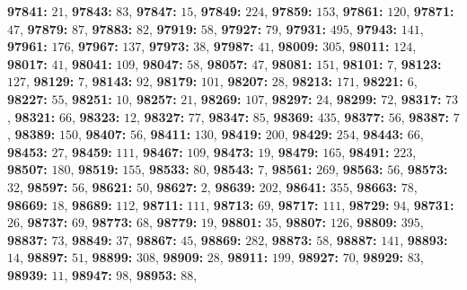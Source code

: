 \textsf{\bfseries 97841:} $21$, \textsf{\bfseries 97843:} $83$, \textsf{\bfseries 97847:} $15$, \textsf{\bfseries 97849:} $224$, \textsf{\bfseries 97859:} $153$, \textsf{\bfseries 97861:} $120$, \textsf{\bfseries 97871:} $47$, \textsf{\bfseries 97879:} $87$, \textsf{\bfseries 97883:} $82$, \textsf{\bfseries 97919:} $58$, \textsf{\bfseries 97927:} $79$, \textsf{\bfseries 97931:} $495$, \textsf{\bfseries 97943:} $141$, \textsf{\bfseries 97961:} $176$, \textsf{\bfseries 97967:} $137$, \textsf{\bfseries 97973:} $38$, \textsf{\bfseries 97987:} $41$, \textsf{\bfseries 98009:} $305$, \textsf{\bfseries 98011:} $124$, \textsf{\bfseries 98017:} $41$, \textsf{\bfseries 98041:} $109$, \textsf{\bfseries 98047:} $58$, \textsf{\bfseries 98057:} $47$, \textsf{\bfseries 98081:} $151$, \textsf{\bfseries 98101:} $7$, \textsf{\bfseries 98123:} $127$, \textsf{\bfseries 98129:} $7$, \textsf{\bfseries 98143:} $92$, \textsf{\bfseries 98179:} $101$, \textsf{\bfseries 98207:} $28$, \textsf{\bfseries 98213:} $171$, \textsf{\bfseries 98221:} $6$, \textsf{\bfseries 98227:} $55$, \textsf{\bfseries 98251:} $10$, \textsf{\bfseries 98257:} $21$, \textsf{\bfseries 98269:} $107$, \textsf{\bfseries 98297:} $24$, \textsf{\bfseries 98299:} $72$, \textsf{\bfseries 98317:} $73$, \textsf{\bfseries 98321:} $66$, \textsf{\bfseries 98323:} $12$, \textsf{\bfseries 98327:} $77$, \textsf{\bfseries 98347:} $85$, \textsf{\bfseries 98369:} $435$, \textsf{\bfseries 98377:} $56$, \textsf{\bfseries 98387:} $7$, \textsf{\bfseries 98389:} $150$, \textsf{\bfseries 98407:} $56$, \textsf{\bfseries 98411:} $130$, \textsf{\bfseries 98419:} $200$, \textsf{\bfseries 98429:} $254$, \textsf{\bfseries 98443:} $66$, \textsf{\bfseries 98453:} $27$, \textsf{\bfseries 98459:} $111$, \textsf{\bfseries 98467:} $109$, \textsf{\bfseries 98473:} $19$, \textsf{\bfseries 98479:} $165$, \textsf{\bfseries 98491:} $223$, \textsf{\bfseries 98507:} $180$, \textsf{\bfseries 98519:} $155$, \textsf{\bfseries 98533:} $80$, \textsf{\bfseries 98543:} $7$, \textsf{\bfseries 98561:} $269$, \textsf{\bfseries 98563:} $56$, \textsf{\bfseries 98573:} $32$, \textsf{\bfseries 98597:} $56$, \textsf{\bfseries 98621:} $50$, \textsf{\bfseries 98627:} $2$, \textsf{\bfseries 98639:} $202$, \textsf{\bfseries 98641:} $355$, \textsf{\bfseries 98663:} $78$, \textsf{\bfseries 98669:} $18$, \textsf{\bfseries 98689:} $112$, \textsf{\bfseries 98711:} $111$, \textsf{\bfseries 98713:} $69$, \textsf{\bfseries 98717:} $111$, \textsf{\bfseries 98729:} $94$, \textsf{\bfseries 98731:} $26$, \textsf{\bfseries 98737:} $69$, \textsf{\bfseries 98773:} $68$, \textsf{\bfseries 98779:} $19$, \textsf{\bfseries 98801:} $35$, \textsf{\bfseries 98807:} $126$, \textsf{\bfseries 98809:} $395$, \textsf{\bfseries 98837:} $73$, \textsf{\bfseries 98849:} $37$, \textsf{\bfseries 98867:} $45$, \textsf{\bfseries 98869:} $282$, \textsf{\bfseries 98873:} $58$, \textsf{\bfseries 98887:} $141$, \textsf{\bfseries 98893:} $14$, \textsf{\bfseries 98897:} $51$, \textsf{\bfseries 98899:} $308$, \textsf{\bfseries 98909:} $28$, \textsf{\bfseries 98911:} $199$, \textsf{\bfseries 98927:} $70$, \textsf{\bfseries 98929:} $83$, \textsf{\bfseries 98939:} $11$, \textsf{\bfseries 98947:} $98$, \textsf{\bfseries 98953:} $88$, 
